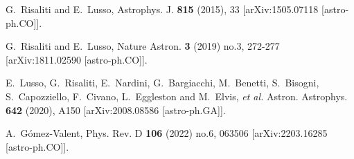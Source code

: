 \documentclass[a4paper,11pt]{article}
\begin{document}
\begin{thebibliography}{99}
G.~Risaliti and E.~Lusso,
Astrophys. J. \textbf{815} (2015), 33
[arXiv:1505.07118 [astro-ph.CO]].

G.~Risaliti and E.~Lusso,
Nature Astron. \textbf{3} (2019) no.3, 272-277
[arXiv:1811.02590 [astro-ph.CO]].

E.~Lusso, G.~Risaliti, E.~Nardini, G.~Bargiacchi, M.~Benetti, S.~Bisogni, S.~Capozziello, F.~Civano, L.~Eggleston and M.~Elvis, \textit{et al.}
Astron. Astrophys. \textbf{642} (2020), A150
[arXiv:2008.08586 [astro-ph.GA]].

A.~G\'omez-Valent,
Phys. Rev. D \textbf{106} (2022) no.6, 063506
[arXiv:2203.16285 [astro-ph.CO]].


\end{thebibliography}
\end{document}
